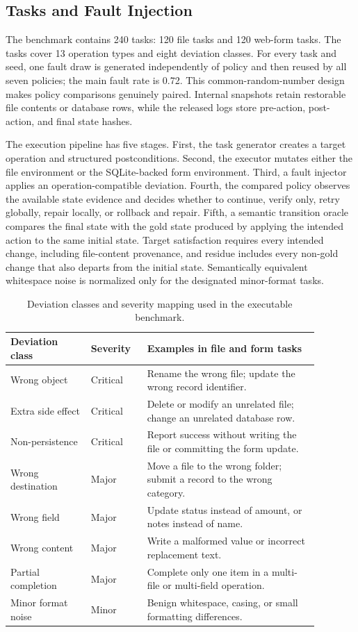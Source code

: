 \documentclass[pdflatex,sn-apa]{sn-jnl}
\begin{document}
\subsection{Tasks and Fault Injection}

The benchmark contains 240 tasks: 120 file tasks and 120 web-form tasks. The tasks cover 13 operation types and eight deviation classes. For every task and seed, one fault draw is generated independently of policy and then reused by all seven policies; the main fault rate is 0.72. This common-random-number design makes policy comparisons genuinely paired. Internal snapshots retain restorable file contents or database rows, while the released logs store pre-action, post-action, and final state hashes.

The execution pipeline has five stages. First, the task generator creates a target operation and structured postconditions. Second, the executor mutates either the file environment or the SQLite-backed form environment. Third, a fault injector applies an operation-compatible deviation. Fourth, the compared policy observes the available state evidence and decides whether to continue, verify only, retry globally, repair locally, or rollback and repair. Fifth, a semantic transition oracle compares the final state with the gold state produced by applying the intended action to the same initial state. Target satisfaction requires every intended change, including file-content provenance, and residue includes every non-gold change that also departs from the initial state. Semantically equivalent whitespace noise is normalized only for the designated minor-format tasks.

\begin{table}[htbp]
\centering
\caption{Deviation classes and severity mapping used in the executable benchmark.}
\label{tab:faults}
\small
\begin{tabular}{p{0.23\linewidth}p{0.16\linewidth}p{0.49\linewidth}}
\toprule
Deviation class & Severity & Examples in file and form tasks \\
\midrule
Wrong object & Critical & Rename the wrong file; update the wrong record identifier. \\
Extra side effect & Critical & Delete or modify an unrelated file; change an unrelated database row. \\
Non-persistence & Critical & Report success without writing the file or committing the form update. \\
Wrong destination & Major & Move a file to the wrong folder; submit a record to the wrong category. \\
Wrong field & Major & Update status instead of amount, or notes instead of name. \\
Wrong content & Major & Write a malformed value or incorrect replacement text. \\
Partial completion & Major & Complete only one item in a multi-file or multi-field operation. \\
Minor format noise & Minor & Benign whitespace, casing, or small formatting differences. \\
\bottomrule
\end{tabular}
\end{table}
\end{document}
